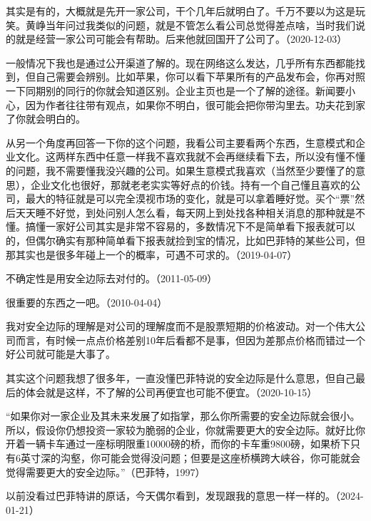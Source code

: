 其实是有的，大概就是先开一家公司，干个几年后就明白了。千万不要以为这是玩笑。黄峥当年问过我类似的问题，就是不管怎么看公司总觉得差点啥，当时我们说的就是经营一家公司可能会有帮助。后来他就回国开了公司了。（2020-12-03）


一般情况下我也是通过公开渠道了解的。现在网络这么发达，几乎所有东西都能找到，但自己需要会辨别。比如苹果，你可以看下苹果所有的产品发布会，你再对照一下同期别的同行的你就会知道区别。企业主页也是一个了解的途径。新闻要小心，因为作者往往带有观点，如果你不明白，很可能会把你带沟里去。功夫花到家了你就会明白的。

从另一个角度再回答一下你的这个问题，我看公司主要看两个东西，生意模式和企业文化。这两样东西中任意一样我不喜欢我就不会再继续看下去，所以没有懂不懂的问题，我不需要懂我没兴趣的公司。如果生意模式我喜欢（当然至少要懂了的意思），企业文化也很好，那就老老实实等好点的价钱。持有一个自己懂且喜欢的公司，最大的特征就是可以完全漠视市场的变化，就是可以拿着睡好觉。买个“票”然后天天睡不好觉，到处问别人怎么看，每天网上到处找各种相关消息的那种就是不懂。搞懂一家好公司其实是非常不容易的，多数情况下不是简单看下报表就可以的，但偶尔确实有那种简单看下报表就捡到宝的情况，比如巴菲特的某些公司，但那其实也是很多年碰上一个的概率，可遇不可求的。（2019-04-07）


不确定性是用安全边际去对付的。（2011-05-09）


很重要的东西之一吧。（2010-04-04）

我对安全边际的理解是对公司的理解度而不是股票短期的价格波动。对一个伟大公司而言，有时候一点点价格差别10年后看都不是事，但因为差那点价格而错过一个好公司就可能是大事了。

其实这个问题我想了很多年，一直没懂巴菲特说的安全边际是什么意思，但自己最后的体会就是这样，不了解的公司再便宜也可能不便宜。（2020-10-15）

“如果你对一家企业及其未来发展了如指掌，那么你所需要的安全边际就会很小。所以，假设你仍想投资一家较为脆弱的企业，你就需要更大的安全边际。就好比你开着一辆卡车通过一座标明限重10000磅的桥，而你的卡车重9800磅，如果桥下只有6英寸深的沟壑，你可能会觉得没问题；但要是这座桥横跨大峡谷，你可能就会觉得需要更大的安全边际。”（巴菲特，1997）

以前没看过巴菲特讲的原话，今天偶尔看到，发现跟我的意思一样一样的。（2024-01-21）

